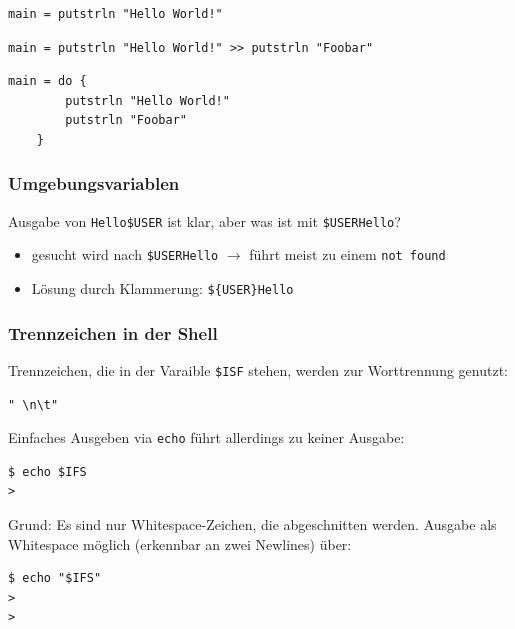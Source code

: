 		\lstHaskell
		\begin{lstlisting}
main = putstrln "Hello World!"
		\end{lstlisting}

		\begin{lstlisting}
main = putstrln "Hello World!" >> putstrln "Foobar"
		\end{lstlisting}

		\begin{lstlisting}
main = do {
		putstrln "Hello World!"
		putstrln "Foobar"
	}
		\end{lstlisting}


	\subsubsection*{Umgebungsvariablen} %
	\label{ssub:umgebungsvariablen}

		Ausgabe von \texttt{Hello\$USER} ist klar, aber was ist mit \texttt{\$USERHello}?
		\begin{itemize}
			\item gesucht wird nach \texttt{\$USERHello} $\rightarrow$ führt meist zu einem \texttt{not found}
			\item Lösung durch Klammerung: \texttt{\$\{USER\}Hello}
		\end{itemize}


	\subsubsection*{Trennzeichen in der Shell} %
	\label{ssub:trennzeichen_in_der_shell}
	
		Trennzeichen, die in der Varaible \texttt{\$ISF} stehen, werden zur Worttrennung genutzt:
		\lstShell
		\begin{lstlisting}
" \n\t"
		\end{lstlisting}
		Einfaches Ausgeben via \texttt{echo} führt allerdings zu keiner Ausgabe:
		\lstShell
		\begin{lstlisting}
$ echo $IFS
>
		\end{lstlisting}
		Grund: Es sind nur Whitespace-Zeichen, die abgeschnitten werden. Ausgabe als Whitespace möglich (erkennbar an zwei Newlines) über:
		\lstShell
		\begin{lstlisting}
$ echo "$IFS"
>
>
		\end{lstlisting}


